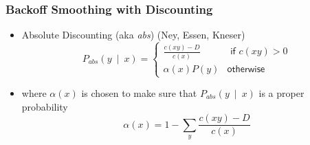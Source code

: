 \begin{comment}
\subsubsection{Katz Backoff}
\begin{frame}
\frametitle{Backoff Smoothing: Katz Backoff}
\begin{itemize}[<+->]
\item Use smoothing over counts for backoff smoothing.
\item Also called discounting since we remove some probability from observed events.
\item Katz Backoff (include Good-Turing with Backoff Smoothing)
\[ P_{\textit{katz}}(y~\mid~x) = \left\{ 
\begin{array}{cc}
\frac{ c^\ast(xy) }{ c(x) } & \textsf{ if $c(xy) > 0$} \\
\alpha(x) P_{\textit{katz}} (y) & \textsf{otherwise}
\end{array}
\right. \]
\end{itemize}
\end{frame}
\end{comment}

\begin{frame}
\frametitle{Backoff Smoothing with Discounting}
\begin{itemize}[<+->]
\item Absolute Discounting (aka \textit{abs}) (Ney, Essen, Kneser)
\[ P_{\textit{abs}}(y~\mid~x) = \left\{ 
\begin{array}{cc}
\frac{ c(xy) - D }{ c(x) } & \textsf{ if $c(xy) > 0$} \\
\alpha(x) P(y) & \textsf{otherwise}
\end{array}
\right. \]
\item where $\alpha(x)$ is chosen to make sure that $P_{\textit{abs}}(y~\mid~x)$ is a proper probability
\[ \alpha(x) = 1 - \sum_y \frac{ c(xy) - D }{ c(x) } \]
\end{itemize}
\end{frame}

